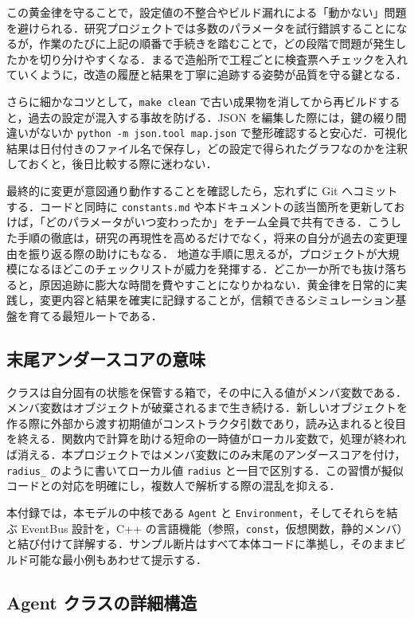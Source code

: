 \documentclass[10pt,letterpaper]{jsarticle}
\begin{document}
この黄金律を守ることで，設定値の不整合やビルド漏れによる「動かない」問題を避けられる．研究プロジェクトでは多数のパラメータを試行錯誤することになるが，作業のたびに上記の順番で手続きを踏むことで，どの段階で問題が発生したかを切り分けやすくなる．まるで造船所で工程ごとに検査票へチェックを入れていくように，改造の履歴と結果を丁寧に追跡する姿勢が品質を守る鍵となる．

さらに細かなコツとして，\verb|make clean| で古い成果物を消してから再ビルドすると，過去の設定が混入する事故を防げる．JSON を編集した際には，鍵の綴り間違いがないか \verb|python -m json.tool map.json| で整形確認すると安心だ．可視化結果は日付付きのファイル名で保存し，どの設定で得られたグラフなのかを注釈しておくと，後日比較する際に迷わない．

最終的に変更が意図通り動作することを確認したら，忘れずに Git へコミットする．コードと同時に \verb|constants.md| や本ドキュメントの該当箇所を更新しておけば，「どのパラメータがいつ変わったか」をチーム全員で共有できる．こうした手順の徹底は，研究の再現性を高めるだけでなく，将来の自分が過去の変更理由を振り返る際の助けにもなる．
地道な手順に思えるが，プロジェクトが大規模になるほどこのチェックリストが威力を発揮する．どこか一か所でも抜け落ちると，原因追跡に膨大な時間を費やすことになりかねない．黄金律を日常的に実践し，変更内容と結果を確実に記録することが，信頼できるシミュレーション基盤を育てる最短ルートである．

\subsection{末尾アンダースコアの意味}
クラスは自分固有の状態を保管する箱で，その中に入る値がメンバ変数である．メンバ変数はオブジェクトが破棄されるまで生き続ける．新しいオブジェクトを作る際に外部から渡す初期値がコンストラクタ引数であり，読み込まれると役目を終える．関数内で計算を助ける短命の一時値がローカル変数で，処理が終われば消える．本プロジェクトではメンバ変数にのみ末尾のアンダースコアを付け，\verb|radius_| のように書いてローカル値 \verb|radius| と一目で区別する．この習慣が擬似コードとの対応を明確にし，複数人で解析する際の混乱を抑える．

本付録では，本モデルの中核である \texttt{Agent} と \texttt{Environment}，そしてそれらを結ぶ EventBus 設計を，C++ の言語機能（参照，\texttt{const}，仮想関数，静的メンバ）と結び付けて詳解する．サンプル断片はすべて本体コードに準拠し，そのままビルド可能な最小例もあわせて提示する．

\subsection{Agent クラスの詳細構造}
\end{document}
